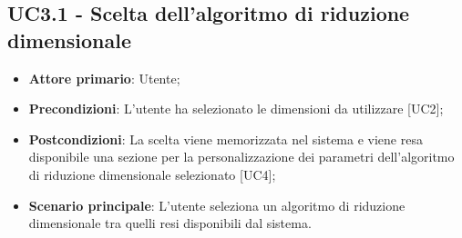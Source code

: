 \subsection{UC3.1 - Scelta dell'algoritmo di riduzione dimensionale}
\begin{itemize}
	\item \textbf{Attore primario}: Utente;
	\item \textbf{Precondizioni}: L'utente ha selezionato le dimensioni da utilizzare [UC2];
	\item \textbf{Postcondizioni}: La scelta viene memorizzata nel sistema e viene resa disponibile una sezione per la personalizzazione dei parametri dell'algoritmo di riduzione dimensionale selezionato [UC4];
	\item \textbf{Scenario principale}: L'utente seleziona un algoritmo di riduzione dimensionale tra quelli resi disponibili dal sistema.
\end{itemize}